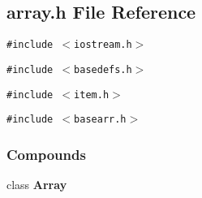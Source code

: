 \subsection{array.h File Reference}
\label{array.h}
{\tt \#include $<$iostream.h$>$}\par
{\tt \#include $<$basedefs.h$>$}\par
{\tt \#include $<$item.h$>$}\par
{\tt \#include $<$basearr.h$>$}\par
\subsubsection*{Compounds}
\begin{CompactItemize}
\item 
class {\bf Array}
\end{CompactItemize}
